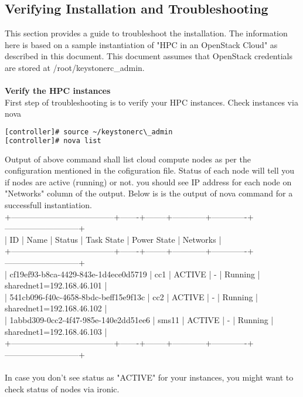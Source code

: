 \subsection{Verifying Installation and Troubleshooting}

This section provides a guide to troubleshoot the installation. The information here is based on a sample instantiation of "HPC in an OpenStack Cloud" as described in this document. This document assumes that OpenStack credentials are stored at /root/keystonerc\_admin.\\
\\
\textbf{Verify the HPC instances}\\
    First step of troubleshooting is to verify your HPC instances. Check instances via nova
\begin{lstlisting}[language=bash,keywords={},upquote=true]
[controller]# source ~/keystonerc\_admin
[controller]# nova list
\end{lstlisting}
Output of above command shall list cloud compute nodes as per the configuration mentioned in the cofiguration file. Status of each node will tell you if nodes are active (running) or not. you should see IP address for each node on "Networks" column of the output. Below is is the output of nova command for a successfull instantiation. \\
+--------------------------------------+-------+--------+------------+-------------+---------------------------+\\
| ID                                   | Name  | Status | Task State | Power State | Networks                  |\\
+--------------------------------------+-------+--------+------------+-------------+---------------------------+\\
| cf19ef93-b8ca-4429-843e-1d4ece0d5719 | cc1   | ACTIVE | -          | Running     | sharednet1=192.168.46.101 |\\
| 541cb096-f40c-4658-8bdc-beff15e9f13c | cc2   | ACTIVE | -          | Running     | sharednet1=192.168.46.102 |\\
| 1abbd309-0cc2-4f47-985e-140e2dd51ee6 | sms11 | ACTIVE | -          | Running     | sharednet1=192.168.46.103 |\\
+--------------------------------------+-------+--------+------------+-------------+---------------------------+\\
\\
In case you don't see status as "ACTIVE" for your instances, you might want to check status of nodes via ironic. 
